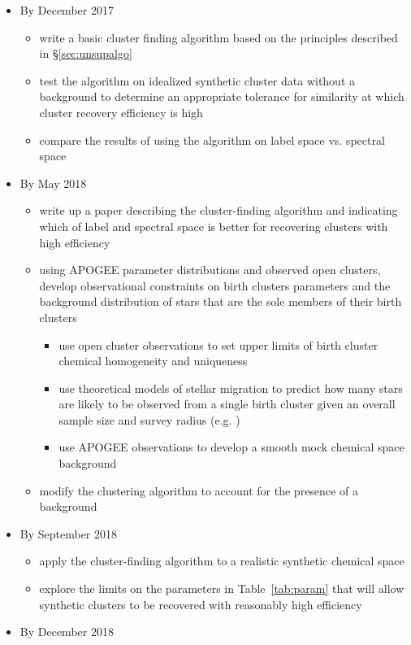 \documentclass[11pt]{article}
\begin{document}
\begin{itemize}
\item By December 2017
\begin{itemize} 
\item write a basic cluster finding algorithm based on the principles described in \S\ref{sec:unsupalgo}
\item test the algorithm on idealized synthetic cluster data without a background to determine an appropriate tolerance for similarity at which cluster recovery efficiency is high
\item compare the results of using the algorithm on label space vs. spectral space
\end{itemize}
\item By May 2018
\begin{itemize}
\item write up a paper describing the cluster-finding algorithm and indicating which of label and spectral space is better for recovering clusters with high efficiency
\item using APOGEE parameter distributions and observed open clusters, develop observational constraints on birth clusters parameters and the background distribution of stars that are the sole members of their birth clusters
\begin{itemize}
\item use open cluster observations to set upper limits of birth cluster chemical homogeneity and uniqueness
\item use theoretical models of stellar migration to predict how many stars are likely to be observed from a single birth cluster given an overall sample size and survey radius (e.g. \citealt{Ting2015a})
\item use APOGEE observations to develop a smooth mock chemical space background
\end{itemize}
\item modify the clustering algorithm to account for the presence of a background
\end{itemize}
\item By September 2018
\begin{itemize}
\item apply the cluster-finding algorithm to a realistic synthetic chemical space
\item explore the limits on the parameters in Table~\ref{tab:param} that will allow synthetic clusters to be recovered with reasonably high efficiency
\end{itemize}
\item By December 2018

\end{itemize}
\end{document}
